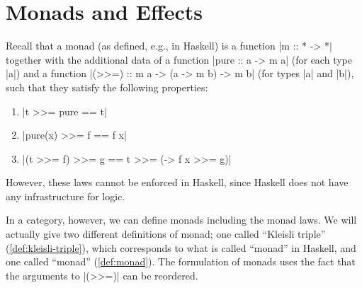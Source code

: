 
\section{Monads and Effects}
\label{sec:monads}
Recall that a monad (as defined, e.g., in Haskell) is a function |m :: * -> *| together with the additional data of a function |pure :: a -> m a| (for each type |a|) and a function |(>>=) :: m a -> (a -> m b) -> m b| (for types |a| and |b|),
such that they satisfy the following properties:
\begin{enumerate}
\item |t >>= pure == t| %
\item |pure(x) >>= f == f x| %
\item |(t >>= f) >>= g == t >>= (\x -> f x >>= g)|%
\end{enumerate}
However, these laws cannot be enforced in Haskell, since Haskell does not have any infrastructure for logic.

In a category, however, we can define monads including the monad laws.
We will actually give two different definitions of monad;
one called ``Kleisli triple'' (\cref{def:kleisli-triple}), which corresponds to what is called ``monad'' in Haskell,
and one called ``monad'' (\cref{def:monad}). 
The formulation of monads uses the fact that the arguments to |(>>=)| can be reordered.

